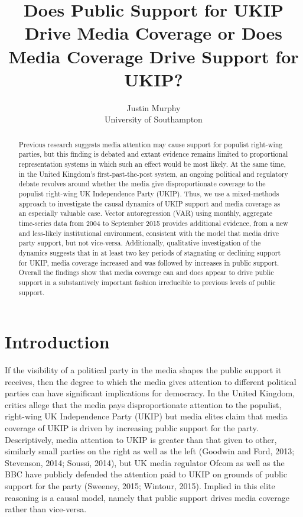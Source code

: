 \documentclass[12pt,article]{article}
\title{Does Public Support for UKIP Drive Media Coverage or Does Media Coverage
Drive Support for UKIP?}
\author{Justin Murphy\\University of Southampton}
\date{}
\begin{document}
\maketitle


\begin{abstract}
Previous research suggests media attention may cause support for populist right-wing parties, but this finding is debated and extant evidence remains limited to proportional representation systems in which such an effect would be most likely. At the same time, in the United Kingdom's first-past-the-post system, an ongoing political and regulatory debate revolves around whether the media give disproportionate coverage to the populist right-wing UK Independence Party (UKIP). Thus, we use a mixed-methods approach to investigate the causal dynamics of UKIP support and media coverage as an especially valuable case. Vector autoregression (VAR) using monthly, aggregate time-series data from 2004 to September 2015 provides additional evidence, from a new and less-likely institutional environment, consistent with the model that media drive party support, but not vice-versa. Additionally, qualitative investigation of
the dynamics suggests that in at least two key periods of stagnating or declining support for UKIP, media coverage increased and was followed by increases in public support. Overall the findings show that media coverage can and does
appear to drive public support in a substantively important fashion irreducible
to previous levels of public support.
\end{abstract}
\doublespacing

\section{Introduction}\label{introduction}

If the visibility of a political party in the media shapes the public
support it receives, then the degree to which the media gives attention
to different political parties can have significant implications for
democracy. In the United Kingdom, critics allege that the media pays
disproportionate attention to the populist, right-wing UK Independence
Party (UKIP) but media elites claim that media coverage of UKIP is
driven by increasing public support for the party. Descriptively, media
attention to UKIP is greater than that given to other, similarly small
parties on the right as well as the left (Goodwin and Ford, 2013;
Stevenson, 2014; Soussi, 2014), but UK media regulator Ofcom as well as
the BBC have publicly defended the attention paid to UKIP on grounds of
public support for the party (Sweeney, 2015; Wintour, 2015). Implied in
this elite reasoning is a causal model, namely that public support
drives media coverage rather than vice-versa.
\end{document}
